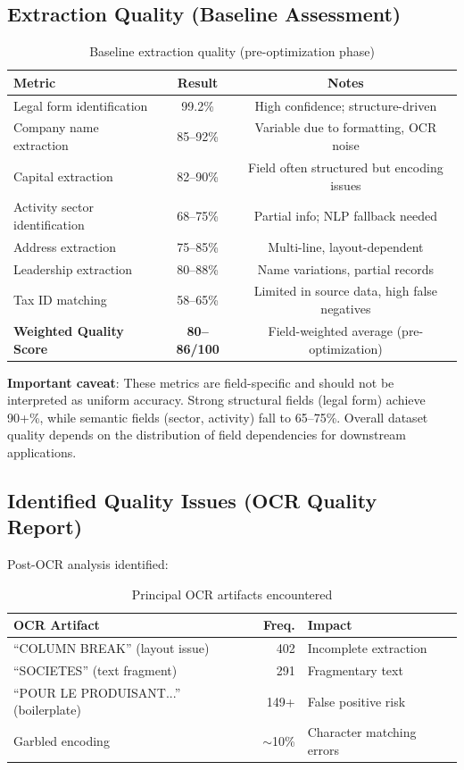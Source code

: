 \documentclass[12pt,a4paper]{report}
\begin{document}
\subsection{Extraction Quality (Baseline Assessment)}

\begin{table}[H]
\centering
\begin{tabular}{|l|c|c|}
\hline
\textbf{Metric} & \textbf{Result} & \textbf{Notes} \\
\hline
Legal form identification & 99.2\% & High confidence; structure-driven \\
Company name extraction & 85--92\% & Variable due to formatting, OCR noise \\
Capital extraction & 82--90\% & Field often structured but encoding issues \\
Activity sector identification & 68--75\% & Partial info; NLP fallback needed \\
Address extraction & 75--85\% & Multi-line, layout-dependent \\
Leadership extraction & 80--88\% & Name variations, partial records \\
Tax ID matching & 58--65\% & Limited in source data, high false negatives \\
\hline
\textbf{Weighted Quality Score} & \textbf{80--86/100} & Field-weighted average (pre-optimization) \\
\hline
\end{tabular}
\caption{Baseline extraction quality (pre-optimization phase)}
\end{table}

\textbf{Important caveat}: These metrics are field-specific and should not be interpreted as uniform accuracy. Strong structural fields (legal form) achieve 90+\%, while semantic fields (sector, activity) fall to 65--75\%. Overall dataset quality depends on the distribution of field dependencies for downstream applications.

\subsection{Identified Quality Issues (OCR Quality Report)}

Post-OCR analysis identified:

\begin{table}[H]
\centering
\begin{tabular}{|l|r|p{4cm}|}
\hline
\textbf{OCR Artifact} & \textbf{Freq.} & \textbf{Impact} \\
\hline
``COLUMN BREAK'' (layout issue) & 402 & Incomplete extraction \\
``SOCIETES'' (text fragment) & 291 & Fragmentary text \\
``POUR LE PRODUISANT...'' (boilerplate) & 149+ & False positive risk \\
Garbled encoding & $\sim$10\% & Character matching errors \\
\hline
\end{tabular}
\caption{Principal OCR artifacts encountered}
\end{table}
\end{document}
